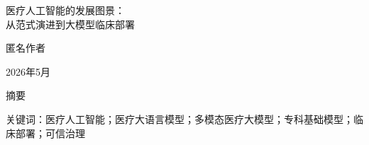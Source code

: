\documentclass[UTF8,a4paper,12pt]{ctexart}
\begin{document}
\begin{center}
{\Large 医疗人工智能的发展图景：\\从范式演进到大模型临床部署\par}
\vspace{0.8em}
匿名作者\par
\vspace{0.4em}
2026年5月
\end{center}

\vspace{1em}
\begin{center}
摘要
\end{center}
\noindent


\noindent 关键词：医疗人工智能；医疗大语言模型；多模态医疗大模型；专科基础模型；临床部署；可信治理









\end{document}
